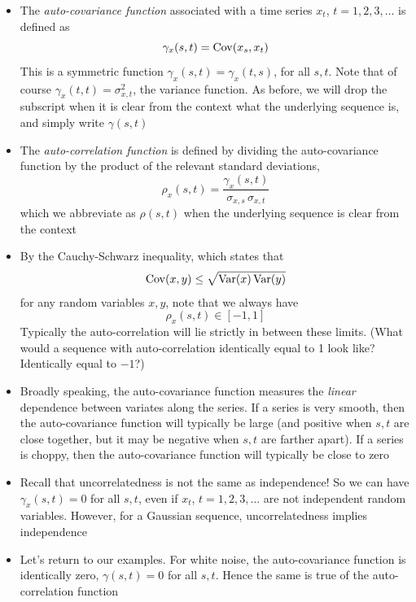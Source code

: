 \documentclass{article}
\begin{document}
\begin{itemize}
\item The \emph{auto-covariance function} associated with a time series $x_t$,
  $t = 1,2,3,\dots$ is defined as
  \[
  \gamma_x(s,t) = \operatorname{Cov}(x_s, x_t)
  \]
  This is a symmetric function $\gamma_x(s,t) = \gamma_x(t,s)$, for all $s,t$.
  Note that of course $\gamma_x(t,t) = \sigma^2_{x,t}$, the variance
  function. As before, we will drop the subscript when it is clear from the
  context what the underlying sequence is, and simply write $\gamma(s,t)$  

\item The \emph{auto-correlation function} is defined by dividing the
  auto-covariance function by the product of the relevant standard deviations, 
  \[
  \rho_x(s,t) = \frac{\gamma_x(s,t)}{\sigma_{x,s} \, \sigma_{x,t}}
  \]
  which we abbreviate as $\rho(s,t)$ when the underlying sequence is clear from
  the context 

\item By the Cauchy-Schwarz inequality, which states that
  \[
  \operatorname{Cov}(x, y) \leq \sqrt{\operatorname{Var}(x) \operatorname{Var}(y)}
  \]
  for any random variables $x,y$, note that we always have
  \[
  \rho_x(s,t) \in [-1, 1]
  \]
  Typically the auto-correlation will lie strictly in between these limits. 
  (What would a sequence with auto-correlation identically equal to 1 look like?  
  Identically equal to $-1$?) 

\item Broadly speaking, the auto-covariance function measures the \emph{linear}
  dependence between variates along the series. If a series is very smooth, then
  the auto-covariance function will typically be large (and positive when $s,t$
  are close together, but it may be negative when $s,t$ are farther apart). If a 
  series is choppy, then the auto-covariance function will typically be close to
  zero 

\item Recall that uncorrelatedness is not the same as independence! So we can
  have $\gamma_x(s,t) = 0$ for all $s,t$, even if $x_t$, $t = 1,2,3,\dots$ are
  not independent random variables. However, for a Gaussian sequence,
  uncorrelatedness implies independence

\item Let's return to our examples. For white noise, the auto-covariance
  function is identically zero, $\gamma(s,t) = 0$ for all $s,t$. Hence the same
  is true of the auto-correlation function


\end{itemize}
\end{document}
